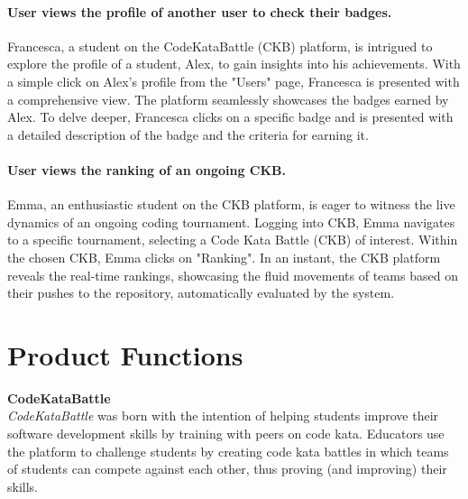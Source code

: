 \paragraph*{User views the profile of another user to check their badges.}
Francesca, a student on the CodeKataBattle (CKB) platform, is intrigued to explore the profile of a student, Alex, to gain insights into his achievements. 
With a simple click on Alex's profile from the "Users" page, Francesca is presented with a comprehensive view. 
The platform seamlessly showcases the badges earned by Alex. 
To delve deeper, Francesca clicks on a specific badge and is presented with a detailed description of the badge and the criteria for earning it.

\paragraph*{User views the ranking of an ongoing CKB.}
Emma, an enthusiastic student on the CKB platform, is eager to witness the live dynamics of an ongoing coding tournament.
Logging into CKB, Emma navigates to a specific tournament, selecting a Code Kata Battle (CKB) of interest.
Within the chosen CKB, Emma clicks on "Ranking". In an instant, the CKB platform reveals the real-time rankings, showcasing the fluid movements of teams based on their pushes to the repository, automatically evaluated by the system.


\section{Product Functions}
\label{sec:product_functions}%
\textbf{CodeKataBattle}\\
\noindent\textit{CodeKataBattle} was born with the intention of helping students improve their software development skills by training with peers on code kata.
Educators use the platform to challenge students by creating code kata battles in which teams of students can compete against each other, thus proving (and improving) their skills.\\
